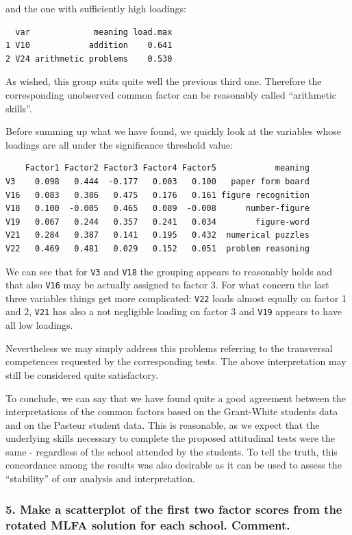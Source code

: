 \documentclass[
  letterpaper,
  DIV=11,
  numbers=noendperiod]{scrartcl}
\begin{document}
and the one with sufficiently high loadings:

\begin{verbatim}
  var             meaning load.max
1 V10            addition    0.641
2 V24 arithmetic problems    0.530
\end{verbatim}

As wished, this group suits quite well the previous third one. Therefore
the corresponding unobserved common factor can be reasonably called
``arithmetic skills''.

Before summing up what we have found, we quickly look at the variables
whose loadings are all under the significance threshold value:

\begin{verbatim}
    Factor1 Factor2 Factor3 Factor4 Factor5            meaning
V3    0.098   0.444  -0.177   0.003   0.100   paper form board
V16   0.083   0.386   0.475   0.176   0.161 figure recognition
V18   0.100  -0.005   0.465   0.089  -0.008      number-figure
V19   0.067   0.244   0.357   0.241   0.034        figure-word
V21   0.284   0.387   0.141   0.195   0.432  numerical puzzles
V22   0.469   0.481   0.029   0.152   0.051  problem reasoning
\end{verbatim}

We can see that for \texttt{V3} and \texttt{V18} the grouping appears to
reasonably holds and that also \texttt{V16} may be actually assigned to
factor 3. For what concern the last three variables things get more
complicated: \texttt{V22} loads almost equally on factor 1 and 2,
\texttt{V21} has also a not negligible loading on factor 3 and
\texttt{V19} appears to have all low loadings.

Nevertheless we may simply address this problems referring to the
transversal competences requested by the corresponding tests. The above
interpretation may still be considered quite satisfactory.

To conclude, we can say that we have found quite a good agreement
between the interpretations of the common factors based on the
Grant-White students data and on the Pasteur student data. This is
reasonable, as we expect that the underlying skills necessary to
complete the proposed attitudinal tests were the same - regardless of
the school attended by the students. To tell the truth, this concordance
among the results was also desirable as it can be used to assess the
``stability'' of our analysis and interpretation.

\hypertarget{make-a-scatterplot-of-the-first-two-factor-scores-from-the-rotated-mlfa-solution-for-each-school.-comment.}{%
\subsubsection{5. Make a scatterplot of the first two factor scores from
the rotated MLFA solution for each school.
Comment.}\label{make-a-scatterplot-of-the-first-two-factor-scores-from-the-rotated-mlfa-solution-for-each-school.-comment.}}
\end{document}
